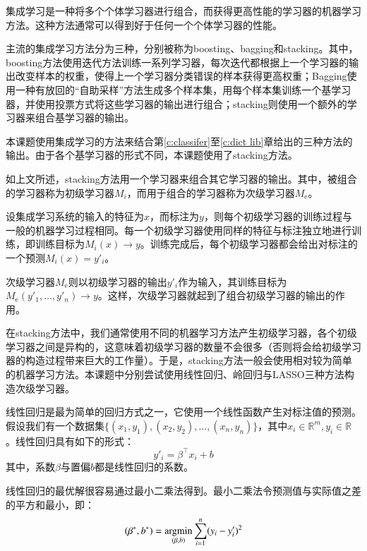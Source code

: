
\label{c:ensemble}
集成学习是一种将多个个体学习器进行组合，而获得更高性能的学习器的机器学习方法。这种方法通常可以得到好于任何一个个体学习器的性能。

主流的集成学习方法分为三种，分别被称为boosting、bagging和stacking。其中，boosting方法使用迭代方法训练一系列学习器，每次迭代都根据上一个学习器的输出改变样本的权重，使得上一个学习器分类错误的样本获得更高权重；Bagging使用一种有放回的“自助采样”方法生成多个样本集，用每个样本集训练一个基学习器，并使用投票方式将这些学习器的输出进行组合；stacking则使用一个额外的学习器来组合基学习器的输出。

本课题使用集成学习的方法来结合第\ref{c:classifer}至\ref{c:dict lib}章给出的三种方法的输出。由于各个基学习器的形式不同，本课题使用了stacking方法。

如上文所述，stacking方法用一个学习器来组合其它学习器的输出。其中，被组合的学习器称为初级学习器$M_i$，而用于组合的学习器称为次级学习器$M_\text{e}$。

设集成学习系统的输入的特征为$x$，而标注为$y$，则每个初级学习器的训练过程与一般的机器学习过程相同。每一个初级学习器使用同样的特征与标注独立地进行训练，即训练目标为$M_i(x) \rightarrow y$。训练完成后，每个初级学习器都会给出对标注的一个预测$M_i(x) = y'_i$。

次级学习器$M_\text{e}$则以初级学习器的输出$y'_i$作为输入，其训练目标为$M_\text{e}(y'_1, \dots, y'_n) \rightarrow y$。这样，次级学习器就起到了组合初级学习器的输出的作用。

在stacking方法中，我们通常使用不同的机器学习方法产生初级学习器，各个初级学习器之间是异构的，这意味着初级学习器的数量不会很多（否则将会给初级学习器的构造过程带来巨大的工作量）。于是，stacking方法一般会使用相对较为简单的机器学习方法。本课题中分别尝试使用线性回归、岭回归与LASSO三种方法构造次级学习器。

线性回归是最为简单的回归方式之一，它使用一个线性函数产生对标注值的预测。假设我们有一个数据集$\bigl\{(x_1, y_1), (x_2, y_2), \dots, (x_n, y_n)\bigr\}$，其中$x_i \in \mathbb{R}^m, y_i \in \mathbb{R}$。线性回归具有如下的形式：
\begin{equation}
y'_i = \beta^\intercal x_i + b
\label{e:linear regression}
\end{equation}
其中，系数$\beta$与置偏$b$都是线性回归的系数。

线性回归的最优解很容易通过最小二乘法得到。最小二乘法令预测值与实际值之差的平方和最小，即：
\begin{equation}
(\beta^*, b^*) = \operatorname*{argmin}_{(\beta, b)} \sum_{i = 1}^{n} (y_i - y'_i)^2
\end{equation}

